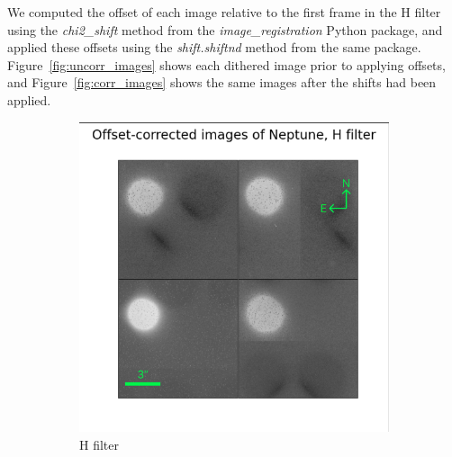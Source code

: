 \documentclass{article}
\begin{document}
    We computed the offset of each image relative to the first frame in the H filter using the \textit{chi2\_shift} method from the \textit{image\_registration} Python package\citep{imagereg}, and applied these offsets using the \textit{shift.shiftnd} method from the same package. Figure~\ref{fig:uncorr_images} shows each dithered image prior to applying offsets, and Figure~\ref{fig:corr_images} shows the same images after the shifts had been applied.

    \begin{figure}
        \centering
        \begin{subfigure}[b]{0.3\textwidth}
            \centering
            \includegraphics[width=\textwidth]{corr_H_sc.png}
            \caption[corr H]%
            {{\small H filter}}    
            \label{fig:corr_H}
        \end{subfigure}
        \hfill
        \begin{subfigure}[b]{0.3\textwidth}
            \centering

\end{subfigure}
\end{figure}
\end{document}
